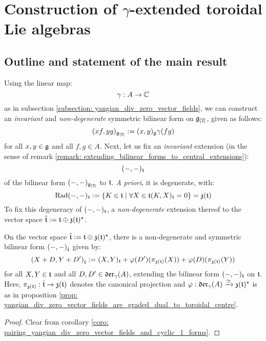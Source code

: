 \section{Construction of \texorpdfstring{$\gamma$}{}-extended toroidal Lie algebras}
    \subsection{Outline and statement of the main result}
        Using the linear map:
            $$\gamma: A \to \mathbb{C}$$
        as in subsection \ref{subsection: yangian_div_zero_vector_fields}, we can construct an \textit{invariant} and \textit{non-degenerate} symmetric bilinear form on $\mathfrak{g}_{[2]}$, given as follows:
            $$(xf, yg)_{\mathfrak{g}_{[2]}} := (x, y)_{\mathfrak{g}} \gamma(fg)$$
        for all $x, y \in \mathfrak{g}$ and all $f, g \in A$. Next, let us fix an \textit{invariant} extension (in the sense of remark \ref{remark: extending_bilinear_forms_to_central_extensions}):
            $$(-, -)_{\mathfrak{t}}$$
        of the bilinear form $(-, -)_{\mathfrak{g}_{[2]}}$ to $\mathfrak{t}$. \textit{A priori}, it is degenerate, with:
            $$\operatorname{Rad}(-, -)_{\mathfrak{t}} := \{ K \in \mathfrak{t} \mid \forall X \in \mathfrak{t} (K, X)_{\mathfrak{t}} = 0 \} = \mathfrak{z}(\mathfrak{t})$$
        To fix this degeneracy of $(-, -)_{\mathfrak{t}}$, a \textit{non-degenerate} extension thereof to the vector space $\hat{\mathfrak{t}} := \mathfrak{t} \oplus \mathfrak{z}(\mathfrak{t})^{\star}$.
        \begin{proposition}
            On the vector space $\hat{\mathfrak{t}} := \mathfrak{t} \oplus \mathfrak{z}(\mathfrak{t})^{\star}$, there is a non-degenerate and symmetric bilinear form $(-, -)_{\hat{\mathfrak{t}}}$ given by:
                $$( X + D, Y + D' )_{\hat{\mathfrak{t}}} := (X, Y)_{\mathfrak{t}} + \varphi(D')( \pi_{\mathfrak{z}(\mathfrak{t})}(X) ) + \varphi(D)( \pi_{\mathfrak{z}(\mathfrak{t})}(Y) )$$
            for all $X, Y \in \mathfrak{t}$ and all $D, D' \in \mathfrak{der}_{\gamma}(A)$, extending the bilinear form $(-, -)_{\mathfrak{t}}$ on $\mathfrak{t}$. Here, $\pi_{\mathfrak{z}(\mathfrak{t})}: \hat{\mathfrak{t}} \to \mathfrak{z}(\mathfrak{t})$ denotes the canonical projection and $\varphi: \mathfrak{der}_{\gamma}(A) \xrightarrow[]{\simeq} \mathfrak{z}(\mathfrak{t})^{\star}$ is as in proposition \ref{prop: yangian_div_zero_vector_fields_are_graded_dual_to_toroidal_centre}.
        \end{proposition}
            \begin{proof}
                Clear from corollary \ref{coro: pairing_yangian_div_zero_vector_fields_and_cyclic_1_forms}.
            \end{proof}

